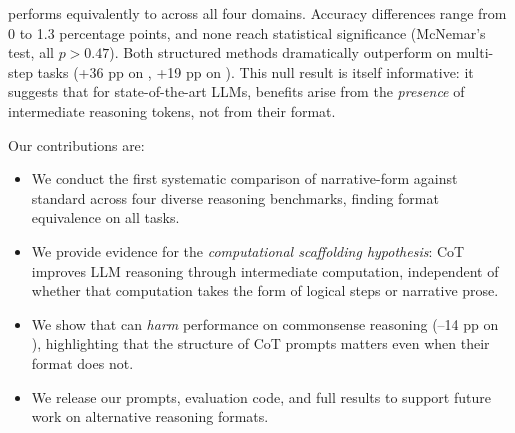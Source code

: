  \storycot performs equivalently to \fewshotcot across all four domains. Accuracy differences range from 0 to 1.3 percentage points, and none reach statistical significance (McNemar's test, all $p > 0.47$). Both structured methods dramatically outperform \directprompt on multi-step tasks (+36 pp on \gsm, +19 pp on \arc). This null result is itself informative: it suggests that for state-of-the-art LLMs, \chainofthought benefits arise from the \emph{presence} of intermediate reasoning tokens, not from their format.

Our contributions are:
\begin{itemize}[leftmargin=*,itemsep=0pt,topsep=0pt]
\item We conduct the first systematic comparison of narrative-form \chainofthought against standard \chainofthought across four diverse reasoning benchmarks, finding format equivalence on all tasks.
\item We provide evidence for the \emph{computational scaffolding hypothesis}: CoT improves LLM reasoning through intermediate computation, independent of whether that computation takes the form of logical steps or narrative prose.
\item We show that \zeroshotcot can \emph{harm} performance on commonsense reasoning (--14 pp on \csqa), highlighting that the structure of CoT prompts matters even when their format does not.
\item We release our prompts, evaluation code, and full results to support future work on alternative reasoning formats.
\end{itemize}
